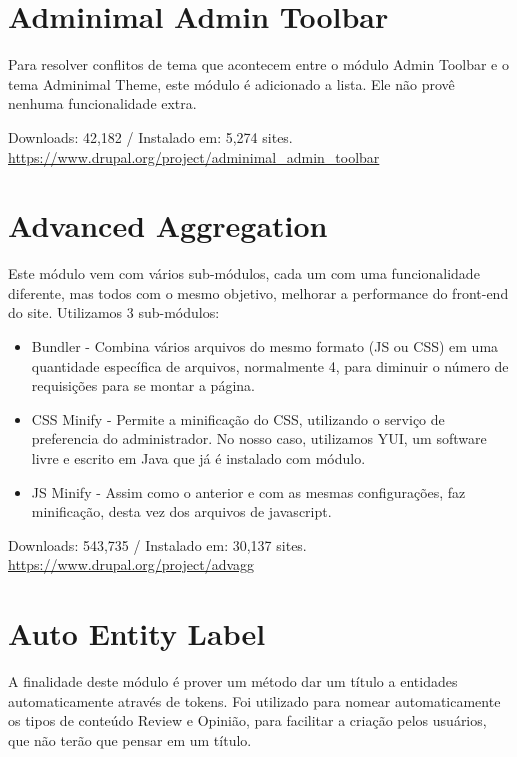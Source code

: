 \section{Adminimal Admin Toolbar}
Para resolver conflitos de tema que acontecem entre o módulo Admin Toolbar e o tema Adminimal Theme, este módulo é adicionado a lista. Ele não provê nenhuma funcionalidade extra.

\begin{center}
  Downloads: 42,182 / Instalado em: 5,274 sites. \\
  \url{https://www.drupal.org/project/adminimal_admin_toolbar}
\end{center}

\section{Advanced Aggregation}
Este módulo vem com vários sub-módulos, cada um com uma funcionalidade diferente, mas todos com o mesmo objetivo, melhorar a performance do front-end do site. Utilizamos 3 sub-módulos:

\begin{itemize}
  \item Bundler - Combina vários arquivos do mesmo formato (JS ou CSS) em uma quantidade específica de arquivos, normalmente 4, para diminuir o número de requisições para se montar a página.
  \item CSS Minify - Permite a minificação do CSS, utilizando o serviço de preferencia do administrador. No nosso caso, utilizamos YUI, um software livre e escrito em Java que já é instalado com módulo.
  \item JS Minify - Assim como o anterior e com as mesmas configurações, faz minificação, desta vez dos arquivos de javascript.
\end{itemize}

\begin{center}
  Downloads: 543,735 / Instalado em: 30,137 sites. \\
  \url{https://www.drupal.org/project/advagg}
\end{center}

\section{Auto Entity Label}
A finalidade deste módulo é prover um método dar um título a entidades automaticamente através de tokens. Foi utilizado para nomear automaticamente os tipos de conteúdo Review e Opinião, para facilitar a criação pelos usuários, que não terão que pensar em um título.

